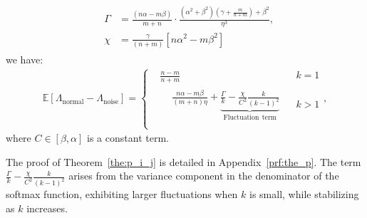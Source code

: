 \begin{theorem}
\begin{equation*}
\begin{aligned}
            & \begin{aligned}
                \Gamma &= \frac{(n\alpha - m\beta)}{m+n} \cdot \frac{(\alpha^2 + \beta^2)(\gamma + \frac{m}{n+m}) + \beta^2 }{\eta^3},\\
                \chi &= \frac{\gamma}{(n+m)} \left[ n\alpha^2 - m\beta^2 \right]
            \end{aligned} 
        \end{aligned}
    \end{equation*}
    we have:
    \begin{equation}
    \label{eq:the}
        \begin{aligned}
            \mathbb{E}[\Lambda_{\text{normal}} - \Lambda_{\text{noise}}] = \left \{
                \begin{aligned}
                    &\frac{n - m}{n + m} ~~ & k = 1 \\
                    & \begin{aligned}
                        & \frac{n\alpha - m\beta}{(m+n)\eta} + \underbrace{\frac{\Gamma}{k} - \frac{\chi}{C^2} \frac{k}{(k-1)^2}}_{\mathrm{Fluctuation}~~\mathrm{term}}
                    \end{aligned}
                     ~~ & k > 1 \\
                \end{aligned}
            \right. ,
        \end{aligned}
    \end{equation}
    where \( C \in [\beta, \alpha] \) is a constant term.
\end{theorem}

The proof of Theorem~\ref{the:p_i_j} is detailed in Appendix~\ref{prf:the_p}. The term \(\frac{\Gamma}{k} - \frac{\chi}{C^2} \frac{k}{(k-1)^2}\) arises from the variance component in the denominator of the softmax function, exhibiting larger fluctuations when \(k\) is small, while stabilizing as \(k\) increases.

